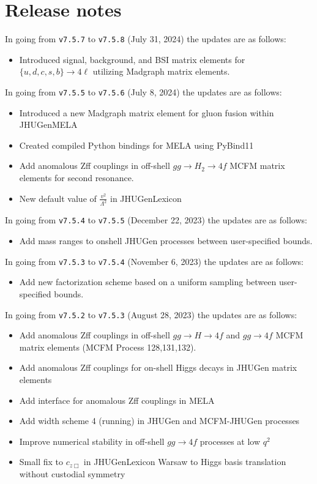 \documentclass[aps,superscriptaddress,nofootinbib]{revtex4}
\begin{document}
\section{Release notes}
\noindent
In going from \verb|v7.5.7| to \verb|v7.5.8| (July 31, 2024) the updates are as follows:
\noindent
\begin{itemize}
\item Introduced signal, background, and BSI matrix elements for $\{u,d,c,s,b\} \rightarrow 4\ell$ utilizing Madgraph matrix elements.
\end{itemize}
\noindent
In going from \verb|v7.5.5| to \verb|v7.5.6| (July 8, 2024) the updates are as follows:
\noindent
\begin{itemize}
\item Introduced a new Madgraph matrix element for gluon fusion within JHUGenMELA
\item Created compiled Python bindings for MELA using PyBind11
\item Add anomalous Zff couplings in off-shell $gg\to H_{2} \to 4f$ MCFM matrix elements for second resonance.
\item New default value of $\frac{v^2}{\Lambda^2}$ in JHUGenLexicon
\end{itemize}
\noindent 
In going from \verb|v7.5.4| to \verb|v7.5.5| (December 22, 2023) the updates are as follows:
\noindent
\begin{itemize}
\item Add mass ranges to onshell JHUGen processes between user-specified bounds.
\end{itemize}
\noindent 
In going from \verb|v7.5.3| to \verb|v7.5.4| (November 6, 2023) the updates are as follows:
\noindent
\begin{itemize}
\item Add new factorization scheme based on a uniform sampling between user-specified bounds.
\end{itemize}
\noindent 
In going from \verb|v7.5.2| to \verb|v7.5.3| (August 28, 2023) the updates are as follows:
\noindent
\begin{itemize}
\item Add anomalous Zff couplings in off-shell $gg\to H \to 4f$ and $gg \to 4f$ MCFM matrix elements (MCFM Process 128,131,132).
\item Add anomalous Zff couplings for on-shell Higgs decays in JHUGen matrix elements
\item Add interface for anomalous Zff couplings in MELA
\item Add width scheme 4 (running) in JHUGen and MCFM-JHUGen processes
\item Improve numerical stability in off-shell $gg \to 4f$ processes at low $q^2$ 
\item Small fix to $c_{z\Box}$ in JHUGenLexicon Warsaw to Higgs basis translation without custodial symmetry
\end{itemize}
\end{document}
